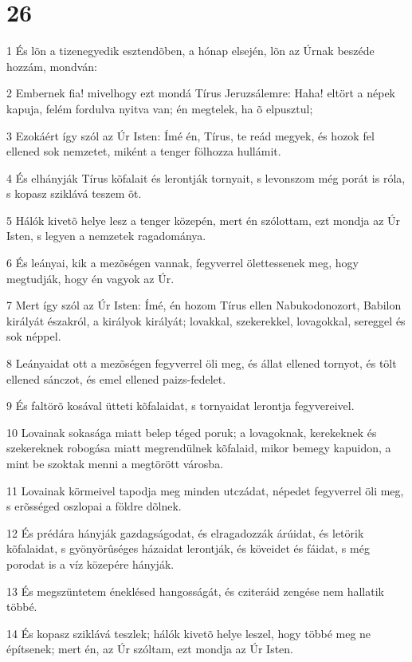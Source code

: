 \chapter{26}

\par 1 És lõn a tizenegyedik esztendõben, a hónap elsején, lõn az Úrnak beszéde hozzám, mondván:
\par 2 Embernek fia! mivelhogy ezt mondá Tírus Jeruzsálemre: Haha! eltört a népek kapuja,  felém fordulva nyitva van; én megtelek, ha õ elpusztul;
\par 3 Ezokáért így szól az Úr Isten: Ímé én, Tírus, te reád megyek, és hozok fel ellened sok nemzetet, miként a tenger fölhozza hullámit.
\par 4 És elhányják Tírus kõfalait és lerontják tornyait, s levonszom még porát is róla, s kopasz sziklává teszem õt.
\par 5 Hálók kivetõ helye lesz a tenger közepén, mert én szólottam, ezt mondja az Úr Isten, s legyen a nemzetek ragadománya.
\par 6 És leányai, kik a mezõségen vannak, fegyverrel ölettessenek meg, hogy megtudják, hogy én vagyok az Úr.
\par 7 Mert így szól az Úr Isten: Ímé, én hozom Tírus ellen Nabukodonozort, Babilon királyát északról, a királyok királyát; lovakkal, szekerekkel, lovagokkal, sereggel és sok néppel.
\par 8 Leányaidat ott a mezõségen fegyverrel öli meg, és állat ellened tornyot, és tölt ellened sánczot, és emel ellened paizs-fedelet.
\par 9 És faltörõ kosával ütteti kõfalaidat, s tornyaidat lerontja fegyvereivel.
\par 10 Lovainak sokasága miatt belep téged poruk; a lovagoknak, kerekeknek és szekereknek robogása miatt megrendülnek kõfalaid, mikor bemegy kapuidon, a mint be szoktak menni a megtörött városba.
\par 11 Lovainak körmeivel tapodja meg minden utczádat, népedet fegyverrel öli meg, s erõsséged oszlopai a földre dõlnek.
\par 12 És prédára hányják gazdagságodat, és elragadozzák árúidat, és letörik kõfalaidat, s gyönyörûséges házaidat lerontják, és köveidet és fáidat, s még porodat is a víz közepére hányják.
\par 13 És megszüntetem éneklésed hangosságát, és cziteráid zengése nem hallatik többé.
\par 14 És kopasz sziklává teszlek; hálók kivetõ helye leszel, hogy többé meg ne építsenek; mert én, az Úr szóltam, ezt mondja az Úr Isten.
